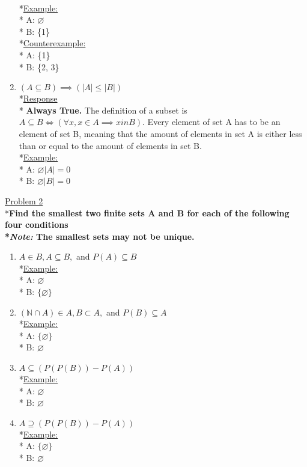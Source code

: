 \documentclass[12pt]{article}
\begin{document}
\begin{enumerate}
\smallskip
\\*\uline{Example:}
\\* A: $\varnothing$ 
\\* B: \{1\}
\smallskip
\\*\uline{Counterexample:}
\\* A: \{1\}\quad
\\* B: \{2, 3\}\quad
\item $(A \subseteq B) \implies (|A| \leq |B|)$
\smallskip
\\*\uline{Response}
\\* \textbf{Always True.} The definition of a subset is $A \subseteq B \iff (\forall x, x \in A \implies x in B).$ Every element of set A has to be an element of set B, meaning that the amount of elements in set A is either less than or equal to the amount of elements in set B.
\smallskip
\\*\uline{Example:}
\\* A: $\varnothing$\quad$|A| = 0$
\\* B: $\varnothing$\quad$|B| = 0$
\smallskip
\end{enumerate}
\medskip
\uline{Problem 2}
\\*\textbf{Find the smallest two finite sets A and B for each of the following four conditions
\\*\textit{Note:} The smallest sets may not be unique.}
\begin{enumerate}
\item $A \in B, A \subseteq B,$ and $P(A) \subseteq B$
\smallskip
\\*\uline{Example:}
\\* A: $\varnothing$
\\* B: $\{\varnothing\}$
\smallskip
\item $(\mathbb{N} \cap A) \in A, B \subset A,$ and $P(B) \subseteq A$
\smallskip
\\*\uline{Example:}
\\* A: $\{\varnothing\}$
\\* B: $\varnothing$
\smallskip
\item $A \subseteq (P(P(B)) - P(A))$
\smallskip
\\*\uline{Example:}
\\* A: $\varnothing$
\\* B: $\varnothing$
\smallskip
\item $A \supseteq (P(P(B))-P(A))$
\smallskip
\\*\uline{Example:}
\\* A: $\{\varnothing\}$
\\* B: $\varnothing$
\smallskip
\end{enumerate}
\end{document}
